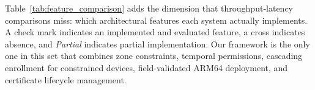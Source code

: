 \documentclass[a4paper,fleqn]{cas-dc}
\begin{document}
\begin{table}[pos=t]
\caption{Throughput and latency: this work versus prior blockchain
  access control systems. N/R = not reported; N/A = not applicable.}
\label{tab:sota}
\end{table}

Table~\ref{tab:feature_comparison} adds the dimension that
throughput-latency comparisons miss: which architectural features each
system actually implements. A check mark indicates an implemented and
evaluated feature, a cross indicates absence, and \textit{Partial}
indicates partial implementation. Our framework is the only one in this set
that combines zone constraints, temporal permissions, cascading
enrollment for constrained devices, field-validated ARM64 deployment,
and certificate lifecycle management.
\end{document}

